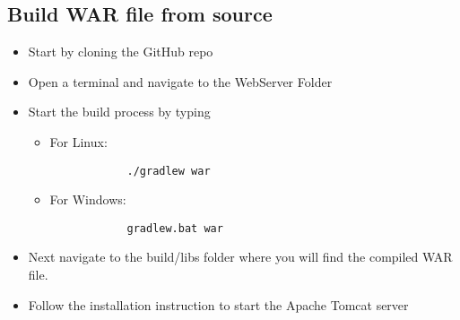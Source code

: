 \subsection{Build WAR file from source}
\begin{itemize}
    \item Start by cloning the GitHub repo
    \item Open a terminal and navigate to the WebServer Folder
    \item Start the build process by typing
    \begin{itemize}
        \item For Linux:\begin{verbatim}
            ./gradlew war
        \end{verbatim}
        \item For Windows:\begin{verbatim}
            gradlew.bat war
        \end{verbatim}
    \end{itemize}
    \item Next navigate to the build/libs folder where you will find the compiled WAR file.
    \item Follow the installation instruction to start the Apache Tomcat server
\end{itemize}


